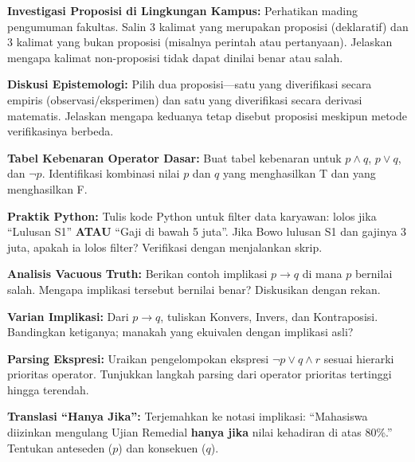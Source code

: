 \documentclass[../main]{subfiles}
\begin{document}
\begin{aktivitas}
  \item \textbf{Investigasi Proposisi di Lingkungan Kampus:} Perhatikan mading pengumuman fakultas. Salin 3 kalimat yang merupakan proposisi (deklaratif) dan 3 kalimat yang bukan proposisi (misalnya perintah atau pertanyaan). Jelaskan mengapa kalimat non-proposisi tidak dapat dinilai benar atau salah.
  \item \textbf{Diskusi Epistemologi:} Pilih dua proposisi---satu yang diverifikasi secara empiris (observasi/eksperimen) dan satu yang diverifikasi secara derivasi matematis. Jelaskan mengapa keduanya tetap disebut proposisi meskipun metode verifikasinya berbeda.
  \item \textbf{Tabel Kebenaran Operator Dasar:} Buat tabel kebenaran untuk $p \wedge q$, $p \vee q$, dan $\neg p$. Identifikasi kombinasi nilai $p$ dan $q$ yang menghasilkan T dan yang menghasilkan F.
  \item \textbf{Praktik Python:} Tulis kode Python untuk filter data karyawan: lolos jika ``Lulusan S1'' \textbf{ATAU} ``Gaji di bawah 5 juta''. Jika Bowo lulusan S1 dan gajinya 3 juta, apakah ia lolos filter? Verifikasi dengan menjalankan skrip.
  \item \textbf{Analisis Vacuous Truth:} Berikan contoh implikasi $p \rightarrow q$ di mana $p$ bernilai salah. Mengapa implikasi tersebut bernilai benar? Diskusikan dengan rekan.
  \item \textbf{Varian Implikasi:} Dari $p \rightarrow q$, tuliskan Konvers, Invers, dan Kontraposisi. Bandingkan ketiganya; manakah yang ekuivalen dengan implikasi asli?
  \item \textbf{Parsing Ekspresi:} Uraikan pengelompokan ekspresi $\neg p \vee q \wedge r$ sesuai hierarki prioritas operator. Tunjukkan langkah parsing dari operator prioritas tertinggi hingga terendah.
  \item \textbf{Translasi ``Hanya Jika'':} Terjemahkan ke notasi implikasi: ``Mahasiswa diizinkan mengulang Ujian Remedial \textbf{hanya jika} nilai kehadiran di atas 80\%.'' Tentukan anteseden ($p$) dan konsekuen ($q$).
\end{aktivitas}
\end{document}
